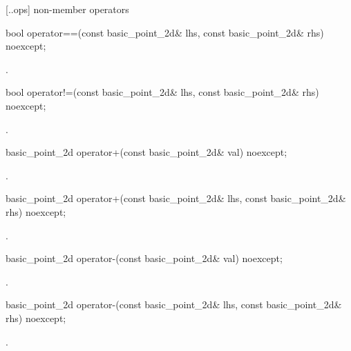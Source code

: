  [\iotwod.\pointtwod.ops] { non-member operators}

%
\begin{itemdecl}
bool operator==(const basic_point_2d& lhs, const basic_point_2d& rhs) noexcept;
\end{itemdecl}
\begin{itemdescr}
\pnum
\returns
{}.
\end{itemdescr}

%
\begin{itemdecl}
bool operator!=(const basic_point_2d& lhs, const basic_point_2d& rhs) noexcept;
\end{itemdecl}
\begin{itemdescr}
\pnum
\returns
{}.
\end{itemdescr}

%
\begin{itemdecl}
basic_point_2d operator+(const basic_point_2d& val) noexcept;
\end{itemdecl}
\begin{itemdescr}
\pnum
\returns
{}.
\end{itemdescr}

%
\begin{itemdecl}
basic_point_2d operator+(const basic_point_2d& lhs, const basic_point_2d& rhs) noexcept;
\end{itemdecl}
\begin{itemdescr}
\pnum
\returns
{}.
\end{itemdescr}

%
\begin{itemdecl}
basic_point_2d operator-(const basic_point_2d& val) noexcept;
\end{itemdecl}
\begin{itemdescr}
\pnum
\returns
{}.
\end{itemdescr}

%
\begin{itemdecl}
basic_point_2d operator-(const basic_point_2d& lhs, const basic_point_2d& rhs) noexcept;
\end{itemdecl}
\begin{itemdescr}
\pnum
\returns
{}.
\end{itemdescr}

